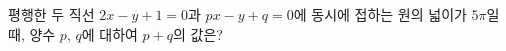 평행한 두 직선 $2x - y + 1 = 0$과 $px - y + q = 0$에 동시에 접하는 원의 넓이가 $5\pi$일 때, 양수 $p$, $q$에 대하여 $p + q$의 값은?
